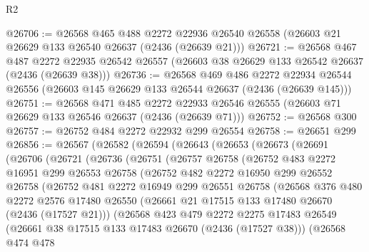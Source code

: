 \begin{lexlean}{R2}
\begin{coremodule}
@26706 := @26568
    @465
    @488
    @2272
    @22936
    @26540
    @26558
    (@26603 @21 @26629 @133 @26540 @26637 (@2436 (@26639 @21)))
@26721 := @26568
    @467
    @487
    @2272
    @22935
    @26542
    @26557
    (@26603 @38 @26629 @133 @26542 @26637 (@2436 (@26639 @38)))
@26736 := @26568
    @469
    @486
    @2272
    @22934
    @26544
    @26556
    (@26603 @145 @26629 @133 @26544 @26637 (@2436 (@26639 @145)))
@26751 := @26568
    @471
    @485
    @2272
    @22933
    @26546
    @26555
    (@26603 @71 @26629 @133 @26546 @26637 (@2436 (@26639 @71)))
@26752 := @26568 @300
@26757 := @26752 @484 @2272 @22932 @299 @26554
@26758 := @26651 @299
@26856 := @26567
    (@26582
      (@26594
        (@26643
          (@26653
            (@26673
              (@26691
                (@26706
                  (@26721
                    (@26736
                      (@26751
                        (@26757
                          @26758
                          (@26752
                            @483
                            @2272
                            @16951
                            @299
                            @26553
                            @26758
                            (@26752
                              @482
                              @2272
                              @16950
                              @299
                              @26552
                              @26758
                              (@26752
                                @481
                                @2272
                                @16949
                                @299
                                @26551
                                @26758
                                (@26568
                                  @376
                                  @480
                                  @2272
                                  @2576
                                  @17480
                                  @26550
                                  (@26661 @21 @17515 @133 @17480 @26670 (@2436 (@17527 @21)))
                                  (@26568
                                    @423
                                    @479
                                    @2272
                                    @2275
                                    @17483
                                    @26549
                                    (@26661 @38 @17515 @133 @17483 @26670 (@2436 (@17527 @38)))
                                    (@26568
                                      @474
                                      @478

\end{coremodule}
\end{lexlean}
